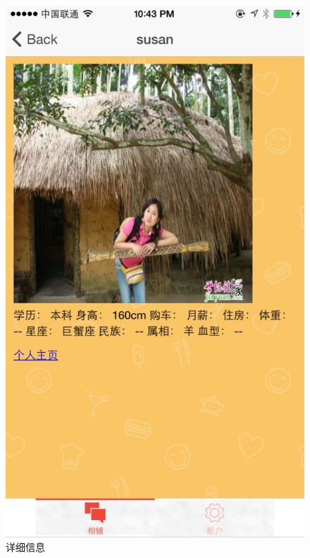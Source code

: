 \begin{figure}[h]
\begin{minipage}[t]{0.3\linewidth}
\centering
\includegraphics[width=\textwidth]{img/chap4/info2.jpg}
\caption{详细信息\label{instagram}}
\end{minipage}
\hfill
\begin{minipage}[t]{0.3\linewidth}
\centering

\end{minipage}
\end{figure}
